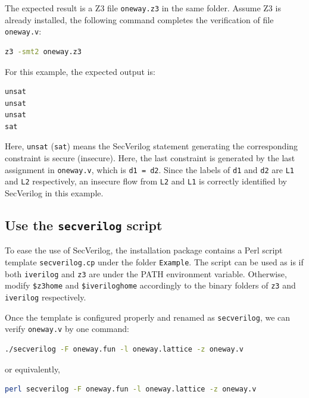 \documentclass [12pt, oneside, a4paper]{article}
\newcommand{\code}[1]{\texttt{#1}}
\begin{document}
The expected result is a Z3 file \code{oneway.z3} in the same folder.
Assume Z3 is already installed, the following command completes the
verification of file \code{oneway.v}:

\begin{lstlisting}[language=bash, frame=none, numbers=none,
keywordstyle=\footnotesize\bfseries, morekeywords={make}]
z3 -smt2 oneway.z3
\end{lstlisting}

For this example, the expected output is:
\begin{lstlisting}[language=bash, frame=none, numbers=none,
keywordstyle=\footnotesize\bfseries, morekeywords={make}]
unsat
unsat
unsat
sat
\end{lstlisting}

Here, \code{unsat} (\code{sat}) means the SecVerilog statement generating the
corresponding constraint is secure (insecure). Here, the last
constraint is generated by the last assignment in \code{oneway.v},
which is \code{d1 = d2}. Since the labels of \code{d1} and \code{d2}
are \code{L1} and \code{L2} respectively, an insecure flow from
\code{L2} and \code{L1} is correctly identified by SecVerilog in this
example.

\subsection{Use the \code{secverilog} script}

To ease the use of SecVerilog, the installation package contains a
Perl script template \code{secverilog.cp} under the folder
\code{Example}. The script can be used as is if both \code{iverilog}
and \code{z3} are under the PATH environment variable. Otherwise,
modify \code{\$z3home} and \code{\$iveriloghome} accordingly to the
binary folders of \code{z3} and \code{iverilog} respectively.

Once the template is configured properly and renamed as
\code{secverilog},  we can verify \code{oneway.v} by one command:

\begin{lstlisting}[language=bash, frame=none, numbers=none,
keywordstyle=\footnotesize\bfseries, morekeywords={make}]
./secverilog -F oneway.fun -l oneway.lattice -z oneway.v
\end{lstlisting}
or equivalently,
\begin{lstlisting}[language=bash, frame=none, numbers=none,
keywordstyle=\footnotesize\bfseries, morekeywords={make}]
perl secverilog -F oneway.fun -l oneway.lattice -z oneway.v
\end{lstlisting}
\end{document}
